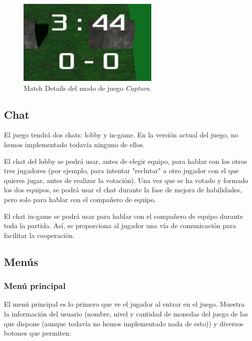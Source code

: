 \begin{figure}[h]
	\centering
	\includegraphics[width=0.8\linewidth]{figures/MatchDetails}
	\caption{Match Details del modo de juego \emph{Captura}.}
	\label{fig:MatchDetails}
\end{figure}

\subsection{Chat}
El juego tendrá dos chats: lobby y in-game. En la versión actual del juego, no hemos implementado todavía ninguno de ellos.

\vspace{\baselineskip}

El chat del lobby se podrá usar, antes de elegir equipo, para hablar con los otros tres jugadores (por ejemplo, para intentar "reclutar" a otro jugador con el que quieres jugar, antes de realizar la votación). Una vez que se ha votado y formado los dos equipos, se podrá usar el chat durante la fase de mejora de habilidades, pero solo para hablar con el compañero de equipo.

El chat in-game se podrá usar para hablar con el compañero de equipo durante toda la partida. Así, se proporciona al jugador una vía de comunicación para facilitar la cooperación.

\subsection{Menús}

\subsubsection{Menú principal}
El menú principal es lo primero que ve el jugador al entrar en el juego. Muestra la información del usuario (nombre, nivel y cantidad de monedas del juego de las que dispone (aunque todavía no hemos implementado nada de esto)) y diversos botones que permiten:

